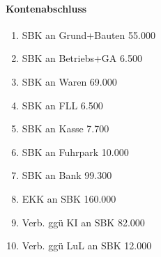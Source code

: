 \documentclass[paper=a4, fontsize=11pt]{scrartcl}
\numberwithin{equation}{section}
\numberwithin{figure}{section}
\numberwithin{table}{section}
\begin{document}
\paragraph{Kontenabschluss}
\begin{enumerate}
\item SBK an Grund+Bauten 55.000
\item SBK an Betriebs+GA 6.500
\item SBK an Waren 69.000
\item SBK an FLL 6.500
\item SBK an Kasse 7.700
\item SBK an Fuhrpark 10.000
\item SBK an Bank 99.300
\item EKK an SBK 160.000
\item Verb. ggü KI an SBK 82.000
\item Verb. ggü LuL an SBK 12.000
\end{enumerate}
\end{document}
